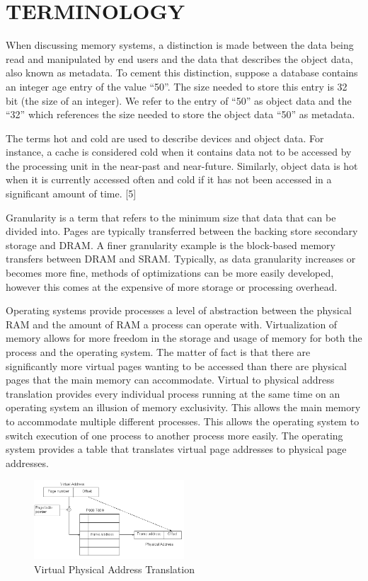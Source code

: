 \documentclass[letterpaper, 10 pt, conference]{ieeeconf}
\begin{document}
\section{TERMINOLOGY}
When discussing memory systems, a distinction is made between the data being read and manipulated by end users and the data that describes the object data, also known as metadata.  To cement this distinction, suppose a database contains an integer age entry of the value “50”.  The size needed to store this entry is 32 bit (the size of an integer).  We refer to the entry of “50” as object data and the “32” which references the size needed to store the object data “50” as metadata.

The terms hot and cold are used to describe devices and object data.  For instance, a cache is considered cold when it contains data not to be accessed by the processing unit in the near-past and near-future.  Similarly, object data is hot when it is currently accessed often and cold if it has not been accessed in a significant amount of time. [5]

Granularity is a term that refers to the minimum size that data that can be divided into.  Pages are typically transferred between the backing store secondary storage and DRAM.  A finer granularity example is the block-based memory transfers between DRAM and SRAM.  Typically, as data granularity increases or becomes more fine, methods of optimizations can be more easily developed, however this comes at the expensive of more storage or processing overhead.

Operating systems provide processes a level of abstraction between the physical RAM and the amount of RAM a process can operate with.  Virtualization of memory allows for more freedom in the storage and usage of memory for both the process and the operating system.  The matter of fact is that there are significantly more virtual pages wanting to be accessed than there are physical pages that the main memory can accommodate.  Virtual to physical address translation provides every individual process running at the same time on an operating system an illusion of memory exclusivity.  This allows the main memory to accommodate multiple different processes.  This allows the operating system to switch execution of one process to another process more easily.  The operating system provides a table that translates virtual page addresses to physical page addresses.

\begin{figure}[H]%
	\centering
	\includegraphics [width=0.5\textwidth] {Figures/Virtual Physical Address Translation.png} 
    \caption{Virtual Physical Address Translation}
\end{figure}
\end{document}

